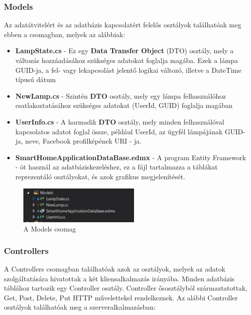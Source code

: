 \documentclass[a4paper,12pt]{report}
\begin{document}
    \subsubsection{Models}
    Az adatátvitelért és az adatbázis kapcsolatért felelős osztályok találhatóak meg ebben a csomagban, melyek az alábbiak:

    \begin{itemize}
        \item \textbf{LampState.cs} - Ez egy \textbf{Data Transfer Object} (DTO) osztály, mely a változás hozzáadásához szükséges
        adatokat foglalja magába. Ezek a lámpa GUID-ja, a fel- vagy lekapcsolást jelentő logikai változó, illetve a DateTime típusú
        dátum
        \item \textbf{NewLamp.cs} - Szintén \textbf{DTO} osztály, mely egy lámpa felhasználóhoz csatlakoztatásához szükséges adatokat
        (UserId, GUID) foglalja magában
        \item \textbf{UserInfo.cs} - A harmadik \textbf{DTO} osztály, mely minden felhasználóval kapcsolatos adatot foglal össze, például
        UserId, az ügyfél lámpájának GUID-ja, neve, Facebook profilképének URI - ja.
        \item \textbf{SmartHomeApplicationDataBase.edmx} - A program Entity Framework - öt használ az adatbáziskezeléshez, ez a fájl
        tartalmazza a táblákat reprezentáló osztályokat, és azok grafikus megjelenítését.
    \end{itemize}

    \begin{figure}[H]
        \centering
        \includegraphics[width=6cm,keepaspectratio]{images/servicemodels.jpg}
        \caption{A Models csomag}
        \label{fig: ModelsPackage}
    \end{figure}

    \subsubsection{Controllers}
    A Controllers csomagban találhatóak azok az osztályok, melyek az adatok szolgáltatására hivatottak a két kliensalkalmazás irányába.
    Minden adatbázis táblához tartozik egy Controller osztály. Controller ősosztályból származtatottak, Get, Post, Delete, Put HTTP
    művelettekel rendelkeznek. Az alábbi Controller osztályok találhatóak meg a szerveralkalmazásban:\\
\end{document}
